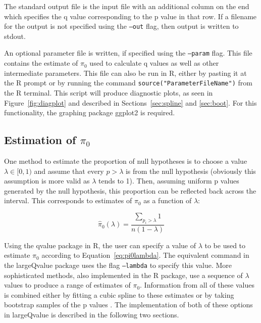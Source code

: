 \documentclass{amsart}
\begin{document}
The standard output file is the input file with an additional column on the end which specifies the q value \citep{storeydirect} corresponding to the p value in that row. If a filename for the output is not specified using the \texttt{--out} flag, then output is written to stdout.

An optional parameter file is written, if specified using the \texttt{--param} flag. This file contains the estimate of $\pi_0$ used to calculate q values as well as other intermediate parameters. This file can also be run in R, either by pasting it at the R prompt or by running the command \texttt{source("ParameterFileName")} from the R terminal. This script will produce diagnostic plots, as seen in Figure~\ref{fig:diagplot} and described in Sections~\ref{sec:spline} and \ref{sec:boot}. For this functionality, the graphing package ggplot2 \citep{ggplot} is required.

\subsection{Estimation of $\pi_0$}
\label{sec:pi0}

One method to estimate the proportion of null hypotheses is to choose a value $\lambda\in [0, 1)$ and assume that every $p > \lambda$ is from the null hypothesis (obviously this assumption is more valid as $\lambda$ tends to 1). Then, assuming uniform p values generated by the null hypothesis, this proportion can be reflected back across the interval. This corresponds to estimates of $\pi_0$ as a function of $\lambda$:

\begin{equation}
  \label{eq:pi0lambda}
  \hat{\pi}_0(\lambda) = \frac{\sum_{p_i > \lambda}1}{n(1-\lambda)} 
\end{equation}

Using the qvalue package in R, the user can specify a value of $\lambda$ to be used to estimate $\pi_0$ according to Equation~\ref{eq:pi0lambda}. The equivalent command in the largeQvalue package uses the flag \texttt{--lambda} to specify this value. More sophisticated methods, also implemented in the R package, use a sequence of $\lambda$ values to produce a range of estimates of $\pi_0$. Information from all of these values is combined either by fitting a cubic spline to these estimates \citep{splinestorey} or by taking bootstrap samples of the p values \citep{bootstorey}. The implementation of both of these options in largeQvalue is described in the following two sections.
\end{document}
